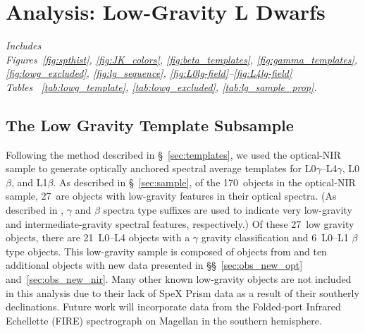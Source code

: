 \documentclass[12pt,preprint]{aastex}
\newcommand{\sample}{170}
\newcommand{\optLowG}{27}
\newcommand{\optBeta}{6}
\newcommand{\optGamma}{21}
\begin{document}


\clearpage
\section{Analysis: Low-Gravity L Dwarfs}
\label{sec:lowg}

\emph{Includes \\
Figures~\ref{fig:spthist}, \ref{fig:JK_colors}, \ref{fig:beta_templates}, \ref{fig:gamma_templates}, \ref{fig:lowg_excluded}, \ref{fig:lg_sequence}, \ref{fig:L0lg-field}--\ref{fig:L4lg-field}\\
Tables ~\ref{tab:lowg_template}, \ref{tab:lowg_excluded}, \ref{tab:lg_sample_prop}.}

\subsection{The Low Gravity Template Subsample}
\label{sec:templates_lowg}

Following the method described in \S~\ref{sec:templates}, we used the optical-NIR sample to generate optically anchored spectral average templates for L0$\gamma$--L4$\gamma$, L0$\beta$, and L1$\beta$.
As described in \S~\ref{sec:sample}, of the \sample~objects in the optical-NIR sample, \optLowG~are objects with low-gravity features in their optical spectra.
(As described in \cite{Cruz09_lowg}, $\gamma$ and $\beta$ spectra type suffixes are used to indicate very low-gravity and intermediate-gravity spectral features, respectively.)
Of these \optLowG~low gravity objects, there are \optGamma~L0--L4 objects with a $\gamma$ gravity classification and \optBeta~L0--L1 $\beta$ type objects.
This low-gravity sample is composed of objects from \citet{Cruz07,Kirkpatrick08,Cruz09_lowg} and ten additional objects with new data presented in \S\S~\ref{sec:obs_new_opt} and~\ref{sec:obs_new_nir}.
Many other known low-gravity objects are not included in this analysis due to their lack of SpeX Prism data as a result of their southerly declinations. 
Future work will incorporate data from the Folded-port Infrared Echellette (FIRE) spectrograph on Magellan \citep{Simcoe:2013kh} in the southern hemisphere.
\end{document}
